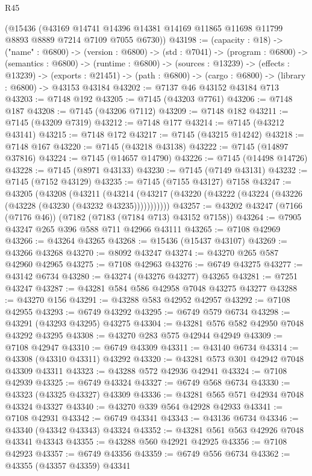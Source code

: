 \begin{lexlean}{R45}
\begin{coremodule}
{    (@15436
      (@43169 @14741 @14396 @14381 @14169 @11865 @11698 @11799 @8893 @8889 @7214 @7109 @7055 @6730))
@43198 := (capacity : @18) ->
  ("name" : @6800) ->
  (version : @6800) ->
  (std : @7041) ->
  (program : @6800) ->
  (semantics : @6800) ->
  (runtime : @6800) ->
  (sources : @13239) ->
  (effects : @13239) ->
  (exports : @21451) -> (path : @6800) -> (cargo : @6800) -> (library : @6800) -> @43153 @43184
@43202 := @7137 @46 @43152 @43184 @713
@43203 := @7148 @192
@43205 := @7145 (@43203 @7761)
@43206 := @7148 @187
@43208 := @7145 (@43206 @7112)
@43209 := @7148 @182
@43211 := @7145 (@43209 @7319)
@43212 := @7148 @177
@43214 := @7145 (@43212 @43141)
@43215 := @7148 @172
@43217 := @7145 (@43215 @14242)
@43218 := @7148 @167
@43220 := @7145 (@43218 @43138)
@43222 := @7145 (@14897 @37816)
@43224 := @7145 (@14657 @14790)
@43226 := @7145 (@14498 @14726)
@43228 := @7145 (@8971 @43133)
@43230 := @7145 (@7149 @43131)
@43232 := @7145 (@7152 @43129)
@43235 := @7145 (@7155 @43127) @7158
@43247 := @43205
    (@43208
      (@43211
        (@43214 (@43217 (@43220 (@43222 (@43224 (@43226 (@43228 (@43230 (@43232 @43235)))))))))))
@43257 := @43202 @43247 (@7166 (@7176 @46)) (@7182 (@7183 (@7184 @713) @43152 @7158))
@43264 := @7905 @43247 @265 @396 @588 @711 @42966 @43111
@43265 := @7108 @42969
@43266 := @43264 @43265
@43268 := @15436 (@15437 @43107)
@43269 := @43266 @43268
@43270 := @8092 @43247
@43274 := @43270 @265 @587 @42960 @42965
@43275 := @7108 @42963
@43276 := @6749 @43275
@43277 := @43142 @6734
@43280 := @43274 (@43276 @43277) @43265
@43281 := @7251 @43247
@43287 := @43281 @584 @586 @42958 @7048 @43275 @43277
@43288 := @43270 @156
@43291 := @43288 @583 @42952 @42957
@43292 := @7108 @42955
@43293 := @6749 @43292
@43295 := @6749 @579 @6734
@43298 := @43291 (@43293 @43295) @43275
@43304 := @43281 @576 @582 @42950 @7048 @43292 @43295
@43308 := @43270 @283 @575 @42944 @42949
@43309 := @7108 @42947
@43310 := @6749 @43309
@43311 := @43140 @6734
@43314 := @43308 (@43310 @43311) @43292
@43320 := @43281 @573 @301 @42942 @7048 @43309 @43311
@43323 := @43288 @572 @42936 @42941
@43324 := @7108 @42939
@43325 := @6749 @43324
@43327 := @6749 @568 @6734
@43330 := @43323 (@43325 @43327) @43309
@43336 := @43281 @565 @571 @42934 @7048 @43324 @43327
@43340 := @43270 @339 @564 @42928 @42933
@43341 := @7108 @42931
@43342 := @6749 @43341
@43343 := @43136 @6734
@43346 := @43340 (@43342 @43343) @43324
@43352 := @43281 @561 @563 @42926 @7048 @43341 @43343
@43355 := @43288 @560 @42921 @42925
@43356 := @7108 @42923
@43357 := @6749 @43356
@43359 := @6749 @556 @6734
@43362 := @43355 (@43357 @43359) @43341
}
\end{coremodule}
\end{lexlean}

